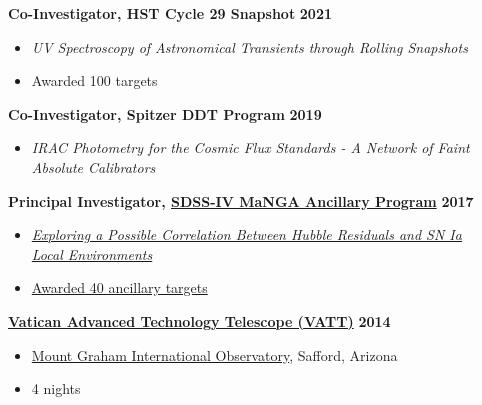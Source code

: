\documentclass[margin]{res}
\begin{document}
\begin{resume}
{\bf Co-Investigator, HST Cycle 29 Snapshot} \hfill {\bf 2021}
\begin{itemize} \itemsep -2pt %
     \item[] \textit{UV Spectroscopy of Astronomical Transients through Rolling Snapshots}
     \item[] Awarded 100 targets
     \end{itemize} \vspace{-12pt}

{\bf Co-Investigator, Spitzer DDT Program} \hfill {\bf 2019}
    \begin{itemize} \itemsep -2pt %
     \item[] \textit{IRAC Photometry for the Cosmic Flux Standards - A Network of Faint \\Absolute Calibrators}
     \end{itemize} \vspace{-12pt}


{\bf Principal Investigator, \href{http://www.sdss.org/dr13/manga/}{SDSS-IV MaNGA Ancillary Program}} \hfill \textbf{2017} 
\begin{itemize} \itemsep -2pt %
     \item[] \href{https://trac.sdss.org/wiki/MANGA/Survey/AncillaryPrograms2017/Rose_SNIa_Environments_and_HR}{\textit{Exploring a Possible Correlation Between Hubble Residuals and SN Ia\\Local Environments}}
     \item[]\href{http://www.sdss.org/dr14/manga/manga-target-selection/ancillary-targets/}{Awarded 40 ancillary targets}
     \end{itemize} \vspace{-12pt}
{\href{http://vaticanobservatory.org/VATT/}{\bf  Vatican Advanced Technology Telescope (VATT)}} \hfill \textbf{2014}
\begin{itemize} \itemsep -2pt %
     \item[] \href{http://mgio.arizona.edu}{Mount Graham International Observatory}, Safford, Arizona
     \item[]4 nights
     \end{itemize} 





\end{resume}
\end{document}
